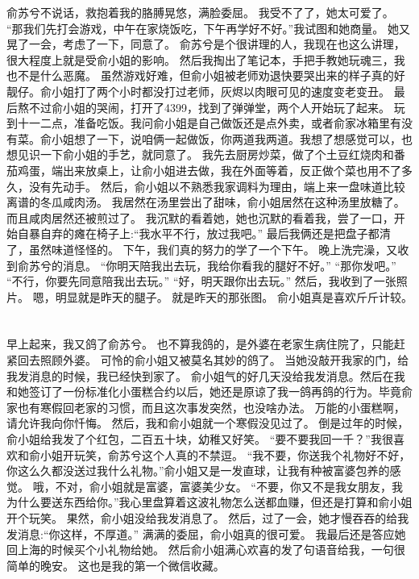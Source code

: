 俞苏兮不说话，救抱着我的胳膊晃悠，满脸委屈。
我受不了了，她太可爱了。
“那我们先打会游戏，中午在家烧饭吃，下午再学好不好。”我试图和她商量。
她又晃了一会，考虑了一下，同意了。
俞苏兮是个很讲理的人，我现在也这么讲理，很大程度上就是受俞小姐的影响。
然后我掏出了笔记本，手把手教她玩魂三，我也不是什么恶魔。
虽然游戏好难，但俞小姐被老师劝退快要哭出来的样子真的好靓仔。俞小姐打了两个小时都没打过老师，灰烬以肉眼可见的速度变老变丑。
最后熬不过俞小姐的哭闹，打开了4399，找到了弹弹堂，两个人开始玩了起来。
玩到十一二点，准备吃饭。我问俞小姐是自己做饭还是点外卖，或者俞家冰箱里有没有菜。俞小姐想了一下，说咱俩一起做饭，你两道我两道。我想了想感觉可以，也想见识一下俞小姐的手艺，就同意了。
我先去厨房炒菜，做了个土豆红烧肉和番茄鸡蛋，端出来放桌上，让俞小姐进去做，我在外面等着，反正做个菜也用不了多久，没有先动手。
然后，俞小姐以不熟悉我家调料为理由，端上来一盘味道比较离谱的冬瓜咸肉汤。
我居然在汤里尝出了甜味，俞小姐居然在这种汤里放糖了。而且咸肉居然还被煎过了。
我沉默的看着她，她也沉默的看着我，尝了一口，开始自暴自弃的瘫在椅子上:“我水平不行，放过我吧。”
最后我俩还是把盘子都清了，虽然味道怪怪的。
下午，我们真的努力的学了一个下午。
晚上洗完澡，又收到俞苏兮的消息。
“你明天陪我出去玩，我给你看我的腿好不好。”
“那你发吧。”
“不行，你要先同意陪我出去玩。”
“好，明天跟你出去玩。”
然后，我收到了一张照片。
嗯，明显就是昨天的腿子。
就是昨天的那张图。
俞小姐真是喜欢斤斤计较。

\chapter{}
早上起来，我又鸽了俞苏兮。
也不算我鸽的，是外婆在老家生病住院了，只能赶紧回去照顾外婆。
可怜的俞小姐又被莫名其妙的鸽了。 当她没敲开我家的门，给我发消息的时候，我已经快到家了。
俞小姐气的好几天没给我发消息。然后在我和她签订了一份标准化小蛋糕合约以后，她还是原谅了我一鸽再鸽的行为。毕竟俞家也有寒假回老家的习惯，而且这次事发突然，也没啥办法。
万能的小蛋糕啊，请允许我向你忏悔。
然后，我和俞小姐就一个寒假没见过了。
倒是过年的时候，俞小姐给我发了个红包，二百五十块，幼稚又好笑。
“要不要我回一千？”我很喜欢和俞小姐开玩笑，俞苏兮这个人真的不禁逗。
“我不要，你送我个礼物好不好，你这么久都没送过我什么礼物。”俞小姐又是一发直球，让我有种被富婆包养的感觉。
哦，不对，俞小姐就是富婆，富婆美少女。
“不要，你又不是我女朋友，我为什么要送东西给你。”我心里盘算着这波礼物怎么送都血赚，但还是打算和俞小姐开个玩笑。
果然，俞小姐没给我发消息了。
然后，过了一会，她才慢吞吞的给我发消息:“你这样，不厚道。” 满满的委屈，俞小姐真的很可爱。
我最后还是答应她回上海的时候买个小礼物给她。
然后俞小姐满心欢喜的发了句语音给我，一句很简单的晚安。
这也是我的第一个微信收藏。

